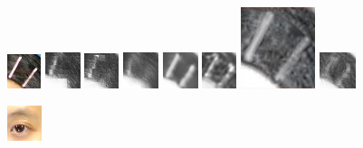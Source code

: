 \documentclass[10pt,twocolumn,letterpaper]{article}
\begin{document}
\begin{figure}[t]
\begin{minipage}[t]{1\linewidth}
\centering
\includegraphics[width=0.11\linewidth]{img/page1_example/hairpin_photo_patch.png}
\includegraphics[width=0.11\linewidth]{img/page1_example/hairpin_mrf_patch.png}
\includegraphics[width=0.11\linewidth]{img/page1_example/hairpin_wmrf_patch.png}
\includegraphics[width=0.11\linewidth]{img/page1_example/hairpin_ssd_patch.png}
\includegraphics[width=0.11\linewidth]{img/page1_example/hairpin_fcnn_patch.png}
\includegraphics[width=0.11\linewidth]{img/page1_example/hairpin_bfcn_patch.png}
\includegraphics[width=0.11\linewidth]{img/page1_example/hairpin_deepart_patch.jpg}
\includegraphics[width=0.11\linewidth]{img/page1_example/hairpin_ours_patch1.png}
\end{minipage}
\begin{minipage}[t]{1\linewidth}
\centering
\includegraphics[width=0.11\linewidth]{img/page1_example/eye_photo.png}

\end{minipage}
\end{figure}
\end{document}
